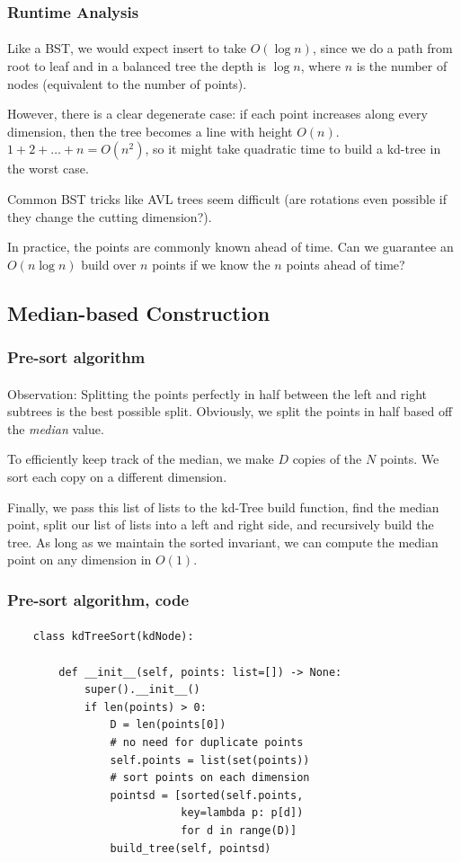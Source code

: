 \documentclass{beamer}                             %
\begin{document}
\begin{frame}
\frametitle{Runtime Analysis}
\framesubtitle{}
Like a BST, we would expect insert to take \( O(\log n) \), since we do a path
from root to leaf and in a balanced tree the depth is \( \log n \), where
\( n \) is the number of nodes (equivalent to the number of points). \pause 

However, there is a clear degenerate case: if each point increases along every
dimension, then the tree becomes a line with height \( O(n) \).
\( 1 + 2 + \dots + n = O(n^2) \), so it might take quadratic time to build
a kd-tree in the worst case. \pause

Common BST tricks like AVL trees seem difficult (are rotations even possible
if they change the cutting dimension?). \pause 

In practice, the points are commonly known ahead of time. Can we guarantee
an \( O(n \log n) \) build over \( n \) points if we know the \( n \) points
ahead of time?
\end{frame}

\subsection{Median-based Construction}

\begin{frame}
\frametitle{Pre-sort algorithm}
\framesubtitle{}
Observation: Splitting the points perfectly in half between the left and right
subtrees is the best possible split. Obviously, we split the points in half
based off the \textit{median} value. \pause

To efficiently keep track of the median, we make \( D \) copies of the \( N \)
points. We sort each copy on a different dimension. \pause

Finally, we pass this list of lists to the kd-Tree build function,
find the median point, split our list of lists into a left and right side,
and recursively build the tree. As long as we maintain the sorted invariant,
we can compute the median point on any dimension in \( O(1) \).
\end{frame}

\begin{frame}[fragile]
\frametitle{Pre-sort algorithm, code}
\framesubtitle{}
\begin{verbatim}
    class kdTreeSort(kdNode):

        def __init__(self, points: list=[]) -> None:
            super().__init__()
            if len(points) > 0:
                D = len(points[0])
                # no need for duplicate points
                self.points = list(set(points))
                # sort points on each dimension
                pointsd = [sorted(self.points,
                           key=lambda p: p[d])
                           for d in range(D)]
                build_tree(self, pointsd)
\end{verbatim}
\end{frame}
\end{document}
